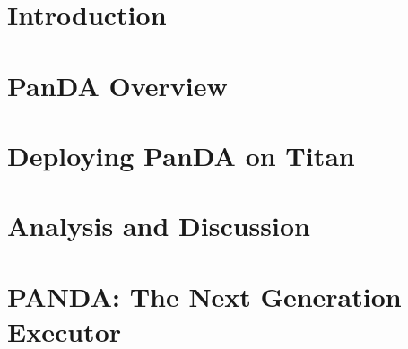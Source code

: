 \documentclass[conference]{IEEEtran}
\begin{document}
\section{Introduction}
\label{sec:intro}



\section{PanDA Overview}
\label{sec:panda_overview}



\section{Deploying PanDA on Titan}
\label{sec:panda_titan}



\section{Analysis and Discussion}
\label{sec:panda_titan}



\section{PANDA\@: The Next Generation Executor}
\label{sec:panda_roadmap}


\end{document}
